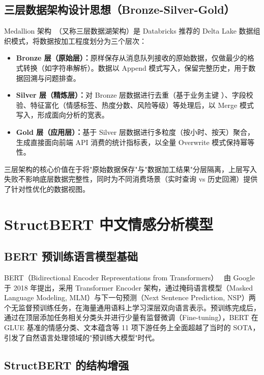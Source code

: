 \subsection{三层数据架构设计思想（Bronze-Silver-Gold）}

Medallion 架构~\cite{databricks2021medallion}（又称三层数据湖架构）是 Databricks 推荐的 Delta Lake 数据组织模式，将数据按加工程度划分为三个层次：

\begin{itemize}
  \item \textbf{Bronze 层（原始层）：}原样保存从消息队列接收的原始数据，仅做最少的格式转换（如字符串解析）。数据以 Append 模式写入，保留完整历史，用于数据回溯与问题排查。
  \item \textbf{Silver 层（精炼层）：}对 Bronze 层数据进行去重（基于业务主键 ）、字段校验、特征富化（情感标签、热度分数、风险等级）等处理后，以 Merge 模式写入，形成面向分析的宽表。
  \item \textbf{Gold 层（应用层）：}基于 Silver 层数据进行多粒度（按小时、按天）聚合，生成直接面向前端 API 消费的统计指标表，以全量 Overwrite 模式保持幂等性。
\end{itemize}

三层架构的核心价值在于将"原始数据保存"与"数据加工结果"分层隔离，上层写入失败不影响底层数据完整性，同时为不同消费场景（实时查询 vs 历史回溯）提供了针对性优化的数据视图。

\section{StructBERT 中文情感分析模型}

\subsection{BERT 预训练语言模型基础}

BERT（Bidirectional Encoder Representations from Transformers）~\cite{devlin2019bert} 由 Google 于 2018 年提出，采用 Transformer Encoder 架构，通过掩码语言模型（Masked Language Modeling, MLM）与下一句预测（Next Sentence Prediction, NSP）两个无监督预训练任务，在海量通用语料上学习深层双向语言表示。预训练完成后，通过在顶层添加任务相关分类头并进行少量有监督微调（Fine-tuning），BERT 在 GLUE 基准的情感分类、文本蕴含等 11 项下游任务上全面超越了当时的 SOTA，引发了自然语言处理领域的"预训练大模型"时代。

\subsection{StructBERT 的结构增强}


